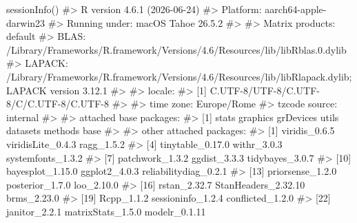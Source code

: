 \documentclass[
  italian,
  letterpaper,
  a4paper,
  11pt,
  open=any]{scrbook}
\newenvironment{Shaded}{\begin{snugshade}}{\end{snugshade}}
\newcommand{\CommentTok}[1]{\textcolor[rgb]{0.37,0.37,0.37}{#1}}
\newcommand{\FunctionTok}[1]{\textcolor[rgb]{0.28,0.35,0.67}{#1}}
\newcommand{\NormalTok}[1]{\textcolor[rgb]{0.00,0.23,0.31}{#1}}
\theoremstyle{plain}
\theoremstyle{definition}
\theoremstyle{definition}
\theoremstyle{remark}
\begin{document}
\begin{tcolorbox}[enhanced jigsaw, arc=.35mm, bottomrule=.15mm, bottomtitle=1mm, breakable, colback=white, colbacktitle=quarto-callout-note-color!10!white, colframe=quarto-callout-note-color-frame, coltitle=black, left=2mm, leftrule=.75mm, opacityback=0, opacitybacktitle=0.6, rightrule=.15mm, title=\textcolor{quarto-callout-note-color}{\faInfo}\hspace{0.5em}{Informazioni sull'ambiente di sviluppo}, titlerule=0mm, toprule=.15mm, toptitle=1mm]

\begin{Shaded}
\begin{Highlighting}[]
\FunctionTok{sessionInfo}\NormalTok{()}
\CommentTok{\#\textgreater{} R version 4.6.1 (2026{-}06{-}24)}
\CommentTok{\#\textgreater{} Platform: aarch64{-}apple{-}darwin23}
\CommentTok{\#\textgreater{} Running under: macOS Tahoe 26.5.2}
\CommentTok{\#\textgreater{} }
\CommentTok{\#\textgreater{} Matrix products: default}
\CommentTok{\#\textgreater{} BLAS:   /Library/Frameworks/R.framework/Versions/4.6/Resources/lib/libRblas.0.dylib }
\CommentTok{\#\textgreater{} LAPACK: /Library/Frameworks/R.framework/Versions/4.6/Resources/lib/libRlapack.dylib;  LAPACK version 3.12.1}
\CommentTok{\#\textgreater{} }
\CommentTok{\#\textgreater{} locale:}
\CommentTok{\#\textgreater{} [1] C.UTF{-}8/UTF{-}8/C.UTF{-}8/C/C.UTF{-}8/C.UTF{-}8}
\CommentTok{\#\textgreater{} }
\CommentTok{\#\textgreater{} time zone: Europe/Rome}
\CommentTok{\#\textgreater{} tzcode source: internal}
\CommentTok{\#\textgreater{} }
\CommentTok{\#\textgreater{} attached base packages:}
\CommentTok{\#\textgreater{} [1] stats     graphics  grDevices utils     datasets  methods   base     }
\CommentTok{\#\textgreater{} }
\CommentTok{\#\textgreater{} other attached packages:}
\CommentTok{\#\textgreater{}  [1] viridis\_0.6.5         viridisLite\_0.4.3     ragg\_1.5.2           }
\CommentTok{\#\textgreater{}  [4] tinytable\_0.17.0      withr\_3.0.3           systemfonts\_1.3.2    }
\CommentTok{\#\textgreater{}  [7] patchwork\_1.3.2       ggdist\_3.3.3          tidybayes\_3.0.7      }
\CommentTok{\#\textgreater{} [10] bayesplot\_1.15.0      ggplot2\_4.0.3         reliabilitydiag\_0.2.1}
\CommentTok{\#\textgreater{} [13] priorsense\_1.2.0      posterior\_1.7.0       loo\_2.10.0           }
\CommentTok{\#\textgreater{} [16] rstan\_2.32.7          StanHeaders\_2.32.10   brms\_2.23.0          }
\CommentTok{\#\textgreater{} [19] Rcpp\_1.1.2            sessioninfo\_1.2.4     conflicted\_1.2.0     }
\CommentTok{\#\textgreater{} [22] janitor\_2.2.1         matrixStats\_1.5.0     modelr\_0.1.11        }

\end{Highlighting}
\end{Shaded}
\end{tcolorbox}
\end{document}
